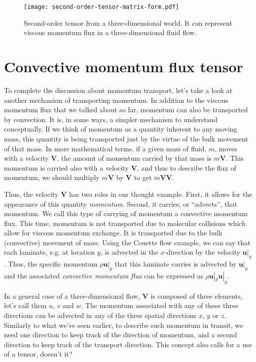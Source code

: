 \documentclass[10pt,twocolumn]{article}
\begin{document}
\begin{figure}[t!]
\centering\texttt{[image: second-order-tensor-matrix-form.pdf]}
\caption{Second-order tensor from a three-dimensional world. It can represent viscous momentum flux in a three-dimensional fluid flow.}
\label{fig:tensor-in-matrix-form}
\end{figure}

\section*{Convective momentum flux tensor}

To complete the discussion about momentum transport, let's take a look at another mechanism of transporting momentum. In addition to the viscous momentum flux that we talked about so far, momentum can also be transported by convection. It is, in some ways, a simpler mechanism to understand conceptually. If we think of momentum as a quantity inherent to any moving mass, this quantity is being transported just by the virtue of the bulk movement of that mass. In more mathematical terms, if a given mass of fluid, $m$, moves with a velocity $\pmb{V}$, the amount of momentum carried by that mass is $m \pmb{V}$. This momentum is carried also with a velocity $\pmb{V}$, and thus to describe the flux of momentum, we should multiply $m \pmb{V}$ by $\pmb{V}$ to get $m \pmb{V} \pmb{V}$.

Thus, the velocity $\pmb{V}$ has two roles in our thought example. First, it allows for the appearance of this quantity \textit{momentum}. Second, it carries, or ``advects'', that momentum. We call this type of carrying of momentum a convective momentum flux. This time, momentum is not transported due to molecular collisions which allow for viscous momentum exchange. It is transported due to the bulk (convective) movement of mass. Using the Couette flow example, we can say that each laminate, e.g. at location $y$, is advected in the $x$-direction by the velocity $\pmb{u}|_y$. Thus, the specific momentum $\rho \pmb{u}|_y$ that this laminate carries is advected by $\pmb{u}|_y$ and the associated \textit{convective momentum flux} can be expressed as $\rho \pmb{u}|_y \pmb{u}|_y$.

In a general case of a three-dimensional flow, $\pmb{V}$ is composed of three elements, let's call them $u$, $v$ and $w$. The momentum associated with any of these three directions can be advected in any of the three spatial directions $x$, $y$ or $z$. Similarly to what we've seen earlier, to describe such momentum in transit, we need one direction to keep track of the direction of momentum, and a second direction to keep track of the transport direction. This concept also calls for a use of a tensor, doesn't it?
\end{document}

